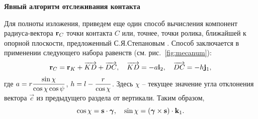 % 


\textbf{Явный алгоритм отслеживания контакта}

Для полноты изложения, приведем еще один способ вычисления компонент радиуса-вектора ${\bf r}_{C}$ точки контакта $C$ или, точнее, точки ролика, ближайшей к опорной плоскости, предложенный С.Я.Степановым \cite{KosenkoGerasimov2015}. Способ заключается в применении следующего набора равенств (см. рис.~\ref{fig:mecanum}):
$$
{\bf r}_{C}={\bf r}_{K}+\overrightarrow{KD}+\overrightarrow{DC},\quad
\overrightarrow{KD}=-a{\bf i}_2,\quad\overrightarrow{DC}=-h{\bf j}_1,
$$
где $a = r\displaystyle\frac{\displaystyle \sin\chi}{\displaystyle \cos\chi\cos\psi}$, $h = l - \displaystyle\frac{\displaystyle r}{\displaystyle \cos\chi}$. Здесь $\chi$ -- текущее значение угла отклонения вектора $\vec{c}$ из предыдущего раздела от 
вертикали. Таким образом,
$$
    \cos\chi = \boldsymbol{\mathbf{s}} \cdot \boldsymbol{\mathbf{\gamma}}, \quad \sin\chi = 
    \left( \boldsymbol{\mathbf{\gamma}} \times \boldsymbol{\mathbf{s}} \right) \cdot {\bf k}_1.
$$
